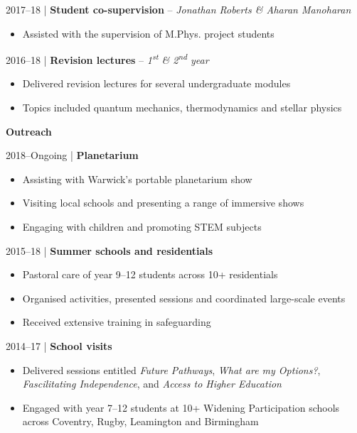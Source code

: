 \documentclass[10pt,a4paper]{altacv}
\begin{document}
\smallskip

\small 2017--18 | \textbf{Student co-supervision} -- \textit{Jonathan Roberts \& Aharan Manoharan} \\
\smallskip
\begin{itemize}
	\item Assisted with the supervision of M.Phys. project students
\end{itemize}

\smallskip

\small 2016--18 | \textbf{Revision lectures} -- \textit{1\textsuperscript{st} \& 2\textsuperscript{nd} year} \\
\smallskip
\begin{itemize}
	\item Delivered revision lectures for several undergraduate modules
	\item Topics included quantum mechanics, thermodynamics and stellar physics
\end{itemize}

\divider

\normalsize \textbf{Outreach}

\medskip

\small 2018--Ongoing | \textbf{Planetarium} \\
\smallskip
\begin{itemize}
	\item Assisting with Warwick's portable planetarium show 
	\item Visiting local schools and presenting a range of immersive shows
	\item Engaging with children and promoting STEM subjects
\end{itemize}

\smallskip

\small 2015--18 | \textbf{Summer schools and residentials} \\
\smallskip
\begin{itemize}
	\item Pastoral care of year 9--12 students across 10+ residentials
	\item Organised activities, presented sessions and coordinated large-scale events
	\item Received extensive training in safeguarding
\end{itemize}

\smallskip

\small 2014--17 | \textbf{School visits} \\
\smallskip
\begin{itemize}
	\item Delivered sessions entitled \textit{Future Pathways}, \textit{What are my Options?}, \textit{Fascilitating Independence}, and \textit{Access to Higher Education} 
	\item Engaged with year 7--12 students at 10+ Widening Participation schools across Coventry, Rugby, Leamington and Birmingham
\end{itemize}
\end{document}
